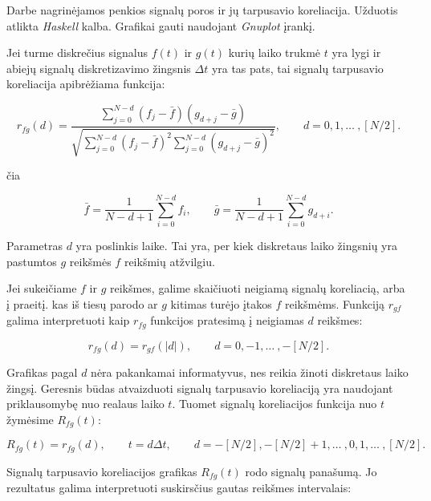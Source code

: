 Darbe nagrinėjamos penkios signalų poros ir jų tarpusavio koreliacija.
Užduotis atlikta \textit{Haskell} kalba. Grafikai gauti naudojant \textit{Gnuplot} įrankį.

Jei turme diskrečius signalus \(f(t)\) ir \(g(t)\) kurių laiko trukmė \(t\) yra lygi
ir abiejų signalų diskretizavimo žingsnis \(\Delta t\) yra tas pats,
tai signalų tarpusavio koreliacija apibrėžiama funkcija:

\begin{equation}
    r_{fg} (d) = \dfrac{\displaystyle \sum\limits_{j=0}^{N-d} {(f_j - \bar{f}) (g_{d+j} - \bar{g})}} {\sqrt{\displaystyle \sum\limits_{j=0}^{N-d} (f_j - \bar{f})^2 \displaystyle \sum\limits_{j=0}^{N-d} (g_{d+j} - \bar{g})^2}},\qquad
    d = 0,1, \ldots\ ,[N/2].
\end{equation}

čia

\begin{equation}
    \bar{f} = \dfrac{1} {N-d+1} \displaystyle \sum\limits_{i=0}^{N-d} {f_i},\qquad
    \bar{g} = \dfrac{1} {N-d+1} \displaystyle \sum\limits_{i=0}^{N-d} {g_{d+i}}.
\end{equation}

Parametras \(d\) yra poslinkis laike.
Tai yra, per kiek diskretaus laiko žingsnių yra pastumtos \(g\) reikšmės \(f\) reikšmių atžvilgiu.

Jei sukeičiame \(f\) ir \(g\) reikšmes, galime skaičiuoti neigiamą signalų koreliacią, arba į praeitį.
kas iš tiesų parodo ar \(g\) kitimas turėjo įtakos \(f\) reikšmėms.
Funkciją \(r_{gf}\) galima interpretuoti kaip \(r_{fg}\) funkcijos pratesimą į neigiamas \(d\) reikšmes:

\begin{equation}
    r_{fg} (d) = r_{gf} (|d|),\qquad d = 0,-1, \ldots\ ,-[N/2].
\end{equation}

Grafikas pagal \(d\) nėra pakankamai informatyvus, nes reikia žinoti diskretaus laiko žingsį.
Geresnis būdas atvaizduoti signalų tarpusavio koreliaciją yra naudojant priklausomybę nuo realaus laiko \(t\).
Tuomet signalų koreliacijos funkcija nuo \(t\) žymėsime \(R_{fg}(t)\):

\begin{equation}
    R_{fg} (t) = r_{fg} (d),\qquad t = d\Delta t,\qquad d = -[N/2],-[N/2]+1, \ldots\ ,0,1, \ldots\ ,[N/2].
\end{equation}

Signalų tarpusavio koreliacijos grafikas \(R_{fg}(t)\) rodo signalų panašumą.
Jo rezultatus galima interpretuoti suskirsčius gautas reikšmes intervalais:

